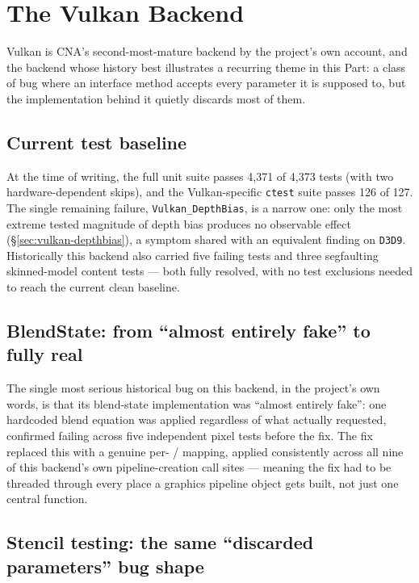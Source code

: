 \chapter{The Vulkan Backend}
\label{ch:vulkan-backend}

Vulkan is CNA's second-most-mature backend by the project's own account, and the backend
whose history best illustrates a recurring theme in this Part: a class of bug where an
interface method accepts every parameter it is supposed to, but the implementation behind it
quietly discards most of them.

\section{Current test baseline}

At the time of writing, the full unit suite passes 4{,}371 of 4{,}373 tests (with two
hardware-dependent skips), and the Vulkan-specific \texttt{ctest} suite passes 126 of 127.
The single remaining failure, \texttt{Vulkan\_DepthBias}, is a narrow one: only the most
extreme tested magnitude of depth bias produces no observable effect
(\S\ref{sec:vulkan-depthbias}), a symptom shared with an equivalent finding on
\texttt{D3D9}. Historically this backend also carried five failing 
tests and three segfaulting skinned-model content tests --- both fully resolved, with no
test exclusions needed to reach the current clean baseline.

\section{BlendState: from ``almost entirely fake'' to fully real}

The single most serious historical bug on this backend, in the project's own words, is that
its blend-state implementation was ``almost entirely fake'': one hardcoded blend equation was
applied regardless of what  actually requested, confirmed failing across
five independent pixel tests before the fix. The fix replaced this with a genuine
per- /  mapping, applied consistently across all nine
of this backend's own pipeline-creation call sites --- meaning the fix had to be threaded
through every place a graphics pipeline object gets built, not just one central function.

\section{Stencil testing: the same ``discarded parameters'' bug shape}

